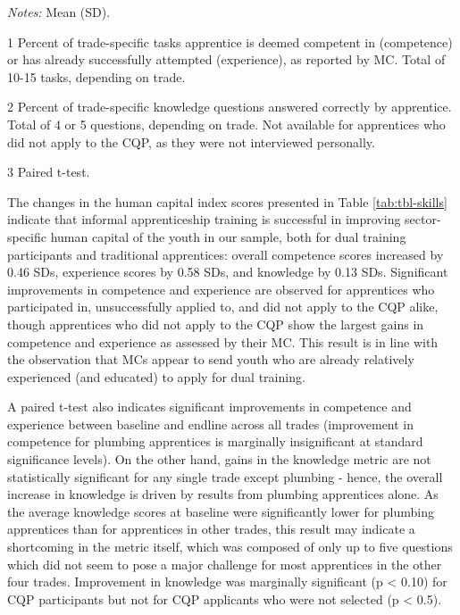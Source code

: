 \documentclass[
  a4paper, twoside, 12pt]{book}
\begin{document}
\begin{singlespacing}
\begin{table}[H]
{\begin{threeparttable}
\begin{tabular}[t]{lcccccc}
\bottomrule
\end{tabular}
\begin{tablenotes}
\small
\item \footnotesize \textit{Notes:} Mean (SD).
\item[1] \footnotesize Percent of trade-specific tasks apprentice is deemed competent in (competence) or has already successfully attempted (experience), as reported by MC. Total of 10-15 tasks, depending on trade.
\item[2] \footnotesize Percent of trade-specific knowledge questions answered correctly by apprentice. Total of 4 or 5 questions, depending on trade. Not available for apprentices who did not apply to the CQP, as they were not interviewed personally.
\item[3] \footnotesize Paired t-test.
\end{tablenotes}
\end{threeparttable}}
\end{table}
\end{singlespacing}

The changes in the human capital index scores presented in Table \ref{tab:tbl-skills} indicate that informal apprenticeship training is successful in improving sector-specific human capital of the youth in our sample, both for dual training participants and traditional apprentices: overall competence scores increased by 0.46 SDs, experience scores by 0.58 SDs, and knowledge by 0.13 SDs. Significant improvements in competence and experience are observed for apprentices who participated in, unsuccessfully applied to, and did not apply to the CQP alike, though apprentices who did not apply to the CQP show the largest gains in competence and experience as assessed by their MC. This result is in line with the observation that MCs appear to send youth who are already relatively experienced (and educated) to apply for dual training.

A paired t-test also indicates significant improvements in competence and experience between baseline and endline across all trades (improvement in competence for plumbing apprentices is marginally insignificant at standard significance levels). On the other hand, gains in the knowledge metric are not statistically significant for any single trade except plumbing - hence, the overall increase in knowledge is driven by results from plumbing apprentices alone. As the average knowledge scores at baseline were significantly lower for plumbing apprentices than for apprentices in other trades, this result may indicate a shortcoming in the metric itself, which was composed of only up to five questions which did not seem to pose a major challenge for most apprentices in the other four trades. Improvement in knowledge was marginally significant (p \textless{} 0.10) for CQP participants but not for CQP applicants who were not selected (p \textless{} 0.5).
\end{document}
